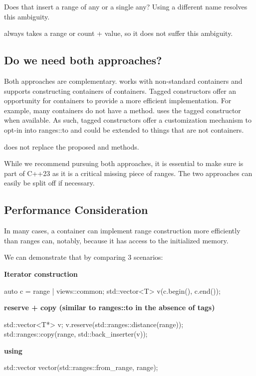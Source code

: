 \documentclass{wg21}
\begin{document}
Does that insert a range of any or a single any?
Using a different name resolves this ambiguity.

 always takes a range or count + value, so it does not suffer this ambiguity.

\subsection{Do we need both approaches?}
Both approaches are complementary.  works with non-standard containers and supports constructing containers of containers.
Tagged constructors offer an opportunity for containers to provide a more efficient implementation.
For example, many containers do not have a  method.
 uses the tagged constructor when available.
As such, tagged constructors offer a customization mechanism to opt-in into ranges::to and could be extended to things that are not containers.

 does not replace the proposed  and  methods.

While we recommend pursuing both approaches, it is essential to make sure  is part of C++23 as it is a critical missing piece of
ranges. The two approaches can easily be split off if necessary.

\subsection{Performance Consideration}

In many cases, a container can implement range construction more efficiently than ranges can,
notably, because it has access to the initialized memory.

We can demonstrate that by comparing 3 scenarios:

\textbf{Iterator construction}
\begin{colorblock}
    auto c = range | views::common;
    std::vector<T> v(c.begin(), c.end());
\end{colorblock}

\textbf{reserve + copy (similar to ranges::to in the absence of tags)}
\begin{colorblock}
    std::vector<T*> v;
    v.reserve(std::ranges::distance(range));
    std::ranges::copy(range, std::back_inserter(v));
\end{colorblock}

\textbf{using }
\begin{colorblock}
    std::vector vector(std::ranges::from_range, range);
\end{colorblock}
\end{document}
